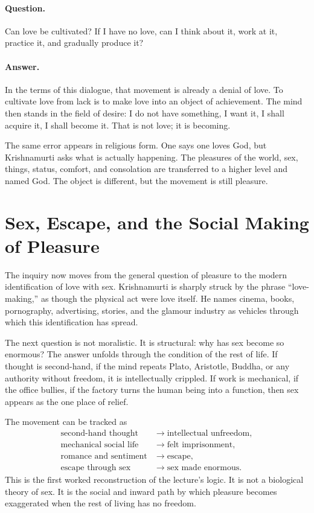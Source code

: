 \paragraph{Question.}
Can love be cultivated? If I have no love, can I think about it, work at it, practice it, and gradually produce it?

\paragraph{Answer.}
In the terms of this dialogue, that movement is already a denial of love. To cultivate love from lack is to make love into an object of achievement. The mind then stands in the field of desire: I do not have something, I want it, I shall acquire it, I shall become it. That is not love; it is becoming.

The same error appears in religious form. One says one loves God, but Krishnamurti asks what is actually happening. The pleasures of the world, sex, things, status, comfort, and consolation are transferred to a higher level and named God. The object is different, but the movement is still pleasure.

\section{Sex, Escape, and the Social Making of Pleasure}

The inquiry now moves from the general question of pleasure to the modern identification of love with sex. Krishnamurti is sharply struck by the phrase ``love-making,'' as though the physical act were love itself. He names cinema, books, pornography, advertising, stories, and the glamour industry as vehicles through which this identification has spread.

The next question is not moralistic. It is structural: why has sex become so enormous? The answer unfolds through the condition of the rest of life. If thought is second-hand, if the mind repeats Plato, Aristotle, Buddha, or any authority without freedom, it is intellectually crippled. If work is mechanical, if the office bullies, if the factory turns the human being into a function, then sex appears as the one place of relief.

The movement can be tracked as
\begin{align}
\text{second-hand thought} &\longrightarrow \text{intellectual unfreedom},\\
\text{mechanical social life} &\longrightarrow \text{felt imprisonment},\\
\text{romance and sentiment} &\longrightarrow \text{escape},\\
\text{escape through sex} &\longrightarrow \text{sex made enormous}.
\end{align}
This is the first worked reconstruction of the lecture's logic. It is not a biological theory of sex. It is the social and inward path by which pleasure becomes exaggerated when the rest of living has no freedom.

